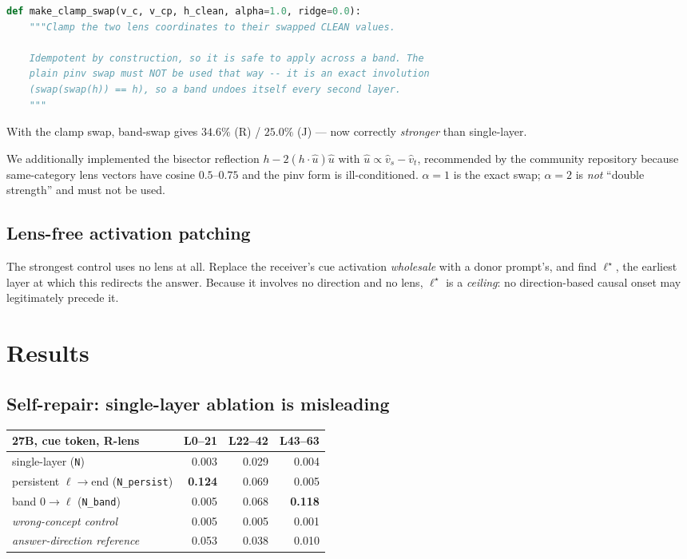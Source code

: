 \documentclass[11pt,a4paper]{article}
\begin{document}
\begin{lstlisting}[language=Python]
def make_clamp_swap(v_c, v_cp, h_clean, alpha=1.0, ridge=0.0):
    """Clamp the two lens coordinates to their swapped CLEAN values.

    Idempotent by construction, so it is safe to apply across a band. The
    plain pinv swap must NOT be used that way -- it is an exact involution
    (swap(swap(h)) == h), so a band undoes itself every second layer.
    """
\end{lstlisting}

\noindent
With the clamp swap, band-swap gives $34.6\%$ (R) / $25.0\%$ (J) --- now correctly
\emph{stronger} than single-layer.

We additionally implemented the bisector reflection $h - 2(h\cdot\hat{u})\hat{u}$ with
$\hat{u} \propto \hat{v}_s - \hat{v}_t$, recommended by the community repository
because same-category lens vectors have cosine $0.5$--$0.75$ and the pinv form is
ill-conditioned. $\alpha = 1$ is the exact swap; $\alpha = 2$ is \emph{not} ``double
strength'' and must not be used.

\subsection{Lens-free activation patching}

The strongest control uses no lens at all. Replace the receiver's cue activation
\emph{wholesale} with a donor prompt's, and find $\ell^\star$, the earliest layer at
which this redirects the answer. Because it involves no direction and no lens,
$\ell^\star$ is a \emph{ceiling}: no direction-based causal onset may legitimately
precede it.

\section{Results}

\subsection{Self-repair: single-layer ablation is misleading}

\begin{center}
\begin{tabular}{@{}lrrr@{}}
\toprule
\textbf{27B, cue token, R-lens} & \textbf{L0--21} & \textbf{L22--42} & \textbf{L43--63} \\
\midrule
single-layer (\texttt{N})         & 0.003 & 0.029 & 0.004 \\
persistent $\ell\to$end (\texttt{N\_persist}) & \textbf{0.124} & 0.069 & 0.005 \\
band $0\to\ell$ (\texttt{N\_band})            & 0.005 & 0.068 & \textbf{0.118} \\
\midrule
\emph{wrong-concept control}      & 0.005 & 0.005 & 0.001 \\
\emph{answer-direction reference} & 0.053 & 0.038 & 0.010 \\
\bottomrule
\end{tabular}
\end{center}
\end{document}
